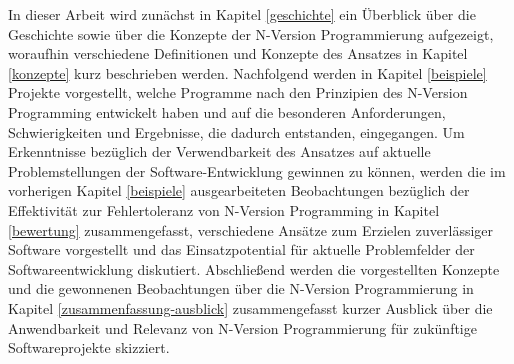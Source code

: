 In dieser Arbeit wird zunächst in Kapitel \ref{geschichte} ein Überblick über die Geschichte sowie über die Konzepte der N-Version Programmierung aufgezeigt, woraufhin verschiedene Definitionen und Konzepte des Ansatzes in Kapitel \ref{konzepte} kurz beschrieben werden. Nachfolgend werden in Kapitel \ref{beispiele} Projekte vorgestellt, welche Programme nach den Prinzipien des N-Version Programming entwickelt haben und auf die besonderen Anforderungen, Schwierigkeiten und Ergebnisse, die dadurch entstanden, eingegangen.
Um Erkenntnisse bezüglich der Verwendbarkeit des Ansatzes auf aktuelle Problemstellungen der Software-Entwicklung gewinnen zu können, werden die im vorherigen Kapitel \ref{beispiele} ausgearbeiteten Beobachtungen bezüglich der Effektivität zur Fehlertoleranz von N-Version Programming in Kapitel \ref{bewertung} zusammengefasst, verschiedene Ansätze zum Erzielen zuverlässiger Software vorgestellt und das Einsatzpotential für aktuelle Problemfelder der Softwareentwicklung diskutiert.
Abschließend werden die vorgestellten Konzepte und die gewonnenen Beobachtungen über die N-Version Programmierung in Kapitel \ref{zusammenfassung-ausblick} zusammengefasst kurzer Ausblick über die Anwendbarkeit und Relevanz von N-Version Programmierung für zukünftige Softwareprojekte skizziert.
